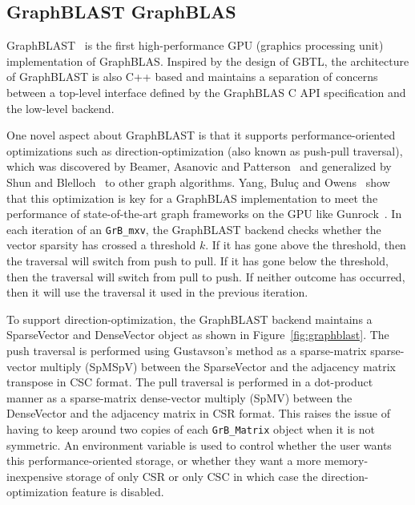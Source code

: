 \subsection{GraphBLAST GraphBLAS}


GraphBLAST~\cite{Yang:2019:GBL} is the first high-performance GPU (graphics processing unit) implementation of GraphBLAS. Inspired by the design of GBTL, the architecture of GraphBLAST is also C++ based and maintains a separation of concerns between a top-level interface defined by the GraphBLAS C API specification and the low-level backend. 

One novel aspect about GraphBLAST is that it supports performance-oriented optimizations such as direction-optimization (also known as push-pull traversal), which was discovered by Beamer, Asanovic and Patterson~\cite{Beamer:2012:DOB} and generalized by Shun and Blelloch~\cite{Shun:2013:Ligra} to other graph algorithms. Yang, Bulu\c{c} and Owens~\cite{Yang:2018:IPE} show that this optimization is key for a GraphBLAS implementation to meet the performance of state-of-the-art graph frameworks on the GPU like Gunrock~\cite{Wang:2017:GGG}. In each iteration of an \verb'GrB_mxv', the GraphBLAST backend checks whether the vector sparsity has crossed a threshold $k$. If it has gone above the threshold, then the traversal will switch from push to pull. If it has gone below the threshold, then the traversal will switch from pull to push. If neither outcome has occurred, then it will use the traversal it used in the previous iteration. 

To support direction-optimization, the GraphBLAST backend maintains a SparseVector and DenseVector object as shown in Figure~\ref{fig:graphblast}. The push traversal is performed using Gustavson's method as a sparse-matrix sparse-vector multiply (SpMSpV) between the SparseVector and the adjacency matrix transpose in CSC format. The pull traversal is performed in a dot-product manner as a sparse-matrix dense-vector multiply (SpMV) between the DenseVector and the adjacency matrix in CSR format. This raises the issue of having to keep around two copies of each \verb'GrB_Matrix' object when it is not symmetric. An environment variable is used to control whether the user wants this performance-oriented storage, or whether they want a more memory-inexpensive storage of only CSR or only CSC in which case the direction-optimization feature is disabled.

